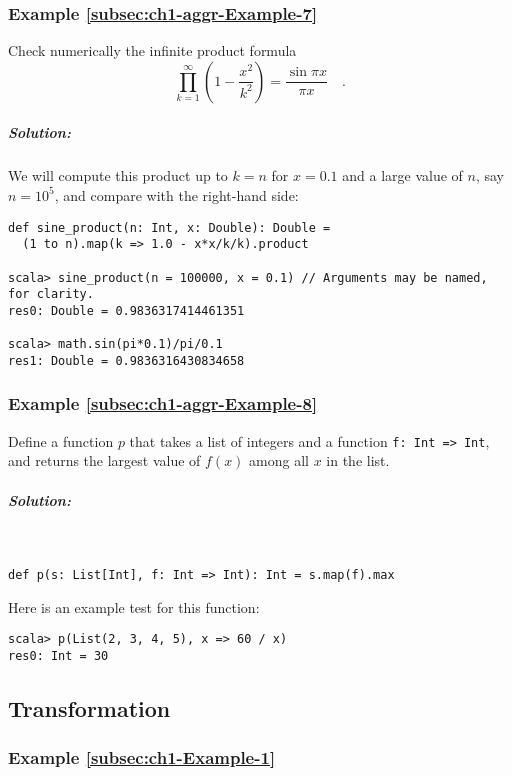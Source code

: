\subsubsection{Example \label{subsec:ch1-aggr-Example-7}\ref{subsec:ch1-aggr-Example-7}}

Check numerically the infinite product formula
\[
\prod_{k=1}^{\infty}\left(1-\frac{x^{2}}{k^{2}}\right)=\frac{\sin\pi x}{\pi x}\quad.
\]


\subparagraph{Solution:}

We will compute this product up to $k=n$ for $x=0.1$ and a large
value of $n$, say $n=10^{5}$, and compare with the right-hand side:
\begin{lstlisting}
def sine_product(n: Int, x: Double): Double =
  (1 to n).map(k => 1.0 - x*x/k/k).product

scala> sine_product(n = 100000, x = 0.1) // Arguments may be named, for clarity.
res0: Double = 0.9836317414461351

scala> math.sin(pi*0.1)/pi/0.1
res1: Double = 0.9836316430834658
\end{lstlisting}


\subsubsection{Example \label{subsec:ch1-aggr-Example-8}\ref{subsec:ch1-aggr-Example-8}}

Define a function $p$ that takes a list of integers and a function
\lstinline!f: Int => Int!, and returns the largest value of $f(x)$
among all $x$ in the list.

\subparagraph{Solution:}

~

\begin{lstlisting}
def p(s: List[Int], f: Int => Int): Int = s.map(f).max
\end{lstlisting}
Here is an example test for this function:
\begin{lstlisting}
scala> p(List(2, 3, 4, 5), x => 60 / x)
res0: Int = 30
\end{lstlisting}


\subsection{Transformation}

\subsubsection{Example \label{subsec:ch1-Example-1}\ref{subsec:ch1-Example-1}}

